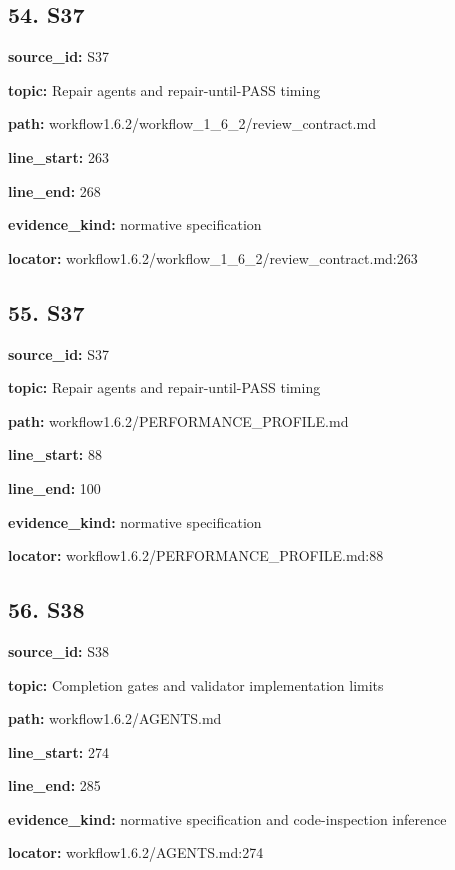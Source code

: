 \documentclass[10pt,a4paper]{article}
\begin{document}
\subsection*{54.\allowbreak{} S37}
\textbf{source\_\allowbreak{}id:} S37\par
\textbf{topic:} Repair agents and repair-\allowbreak{}until-\allowbreak{}PASS timing\par
\textbf{path:} workflow1.\allowbreak{}6.\allowbreak{}2/\allowbreak{}workflow\_\allowbreak{}1\_\allowbreak{}6\_\allowbreak{}2/\allowbreak{}review\_\allowbreak{}contract.\allowbreak{}md\par
\textbf{line\_\allowbreak{}start:} 263\par
\textbf{line\_\allowbreak{}end:} 268\par
\textbf{evidence\_\allowbreak{}kind:} normative specification\par
\textbf{locator:} workflow1.\allowbreak{}6.\allowbreak{}2/\allowbreak{}workflow\_\allowbreak{}1\_\allowbreak{}6\_\allowbreak{}2/\allowbreak{}review\_\allowbreak{}contract.\allowbreak{}md:263\par
\subsection*{55.\allowbreak{} S37}
\textbf{source\_\allowbreak{}id:} S37\par
\textbf{topic:} Repair agents and repair-\allowbreak{}until-\allowbreak{}PASS timing\par
\textbf{path:} workflow1.\allowbreak{}6.\allowbreak{}2/\allowbreak{}PERFORMANCE\_\allowbreak{}PROFILE.\allowbreak{}md\par
\textbf{line\_\allowbreak{}start:} 88\par
\textbf{line\_\allowbreak{}end:} 100\par
\textbf{evidence\_\allowbreak{}kind:} normative specification\par
\textbf{locator:} workflow1.\allowbreak{}6.\allowbreak{}2/\allowbreak{}PERFORMANCE\_\allowbreak{}PROFILE.\allowbreak{}md:88\par
\subsection*{56.\allowbreak{} S38}
\textbf{source\_\allowbreak{}id:} S38\par
\textbf{topic:} Completion gates and validator implementation limits\par
\textbf{path:} workflow1.\allowbreak{}6.\allowbreak{}2/\allowbreak{}AGENTS.\allowbreak{}md\par
\textbf{line\_\allowbreak{}start:} 274\par
\textbf{line\_\allowbreak{}end:} 285\par
\textbf{evidence\_\allowbreak{}kind:} normative specification and code-\allowbreak{}inspection inference\par
\textbf{locator:} workflow1.\allowbreak{}6.\allowbreak{}2/\allowbreak{}AGENTS.\allowbreak{}md:274\par
\end{document}
